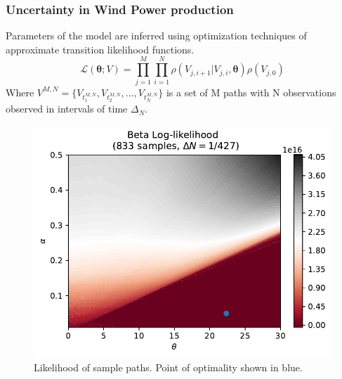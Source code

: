 \documentclass[aspectratio=169]{beamer}\usepackage[utf8]{inputenc}
\begin{document}
\begin{frame}\frametitle{Uncertainty in Wind Power production}
\noindent
\begin{minipage}[t]{0.5\textwidth}
\hskip 10pt
Parameters of the model are inferred using optimization techniques of approximate transition likelihood functions.
\begin{equation*}
\mathcal{L}(\bm{\theta};V) =\prod\limits_{j=1}^M \prod\limits_{i=1}^N \rho ( {V_{j,i+1}|V_{j,i}}, \bm{\theta})  \rho (V_{j,0})
\end{equation*}
Where  $ V^{M,N}=\{ V_{t_1^{M,N}} , V_{t_2^{M,N}} ,\ldots , V_{t_N^{M,N}} \}$ is a set of M paths with N observations observed in intervals of time $\Delta_N$.
\end{minipage}%
\begin{minipage}[t]{0.5\textwidth}
\begin{figure}
\includegraphics[width=0.8\linewidth]{plots_SGD/ISO_833_inter=427.pdf}
   \caption{Likelihood of sample paths. Point of optimality shown in blue.}
\label{samples}
\end{figure}
\end{minipage}
\end{frame}
\end{document}
